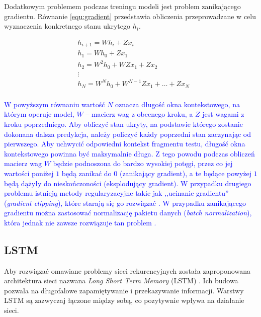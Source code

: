 \documentclass[data-science]{agh-wi} %
\begin{document}
Dodatkowym problemem podczas treningu modeli jest problem zanikającego gradientu. Równanie \ref*{equ:gradient} przedstawia obliczenia przeprowadzane w celu wyznaczenia konkretnego stanu ukrytego $h_i$.

\begin{equation} 
    \begin{aligned}
         & h_{i+1}=Wh_i+Zx_i  \\
         & h_1=Wh_0+Zx_1  \\
         & h_2=W^2h_0+WZx_1+Zx_2 \\
         & \vdots \\
         & h_N = W^Nh_0+W^{N-1}Zx_1 +\dots + Zx_N\\
    \end{aligned}
    \label{equ:gradient}
\end{equation}

\textcolor{blue}{W powyższym równaniu wartość $N$ oznacza długość okna kontekstowego, na którym operuje model, $W$ -- macierz wag z obecnego kroku, a $Z$ jest wagami z kroku poprzedniego. Aby obliczyć stan ukryty, na podstawie którego zostanie dokonana dalsza predykcja, należy policzyć każdy poprzedni stan zaczynając od pierwszego. Aby uchwycić odpowiedni kontekst fragmentu testu, długość okna kontekstowego powinna być maksymalnie długa. Z tego powodu podczas obliczeń macierz wag $W$ będzie podnoszona do bardzo wysokiej potęgi, przez co jej wartości poniżej $1$ będą zanikać do $0$ (zanikający gradient), a te będące powyżej $1$ będą dążyły do nieskończoności (eksplodujący gradient). W przypadku drugiego problemu istnieją metody regularyzacyjne takie jak ,,ucinanie gradientu'' (\textit{gradient clipping}), które starają się go rozwiązać \cite*{deeplearning_book}. W przypadku zanikającego gradientu można zastosować normalizację pakietu danych (\textit{batch normalization}), która jednak nie zawsze rozwiązuje tan problem \cite*{batch_norm}.}

\subsection{LSTM}
Aby rozwiązać omawiane problemy sieci rekurencyjnych została zaproponowana architektura sieci nazwana \textit{Long Short Term Memory} (LSTM) \cite{lstm_og}. Ich budowa pozwala na długofalowe zapamiętywanie i przekazywanie informacji. Warstwy LSTM są zazwyczaj łączone między sobą, co pozytywnie wpływa na działanie sieci.
\end{document}
